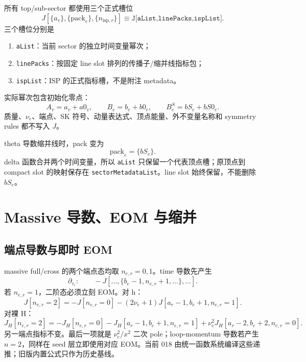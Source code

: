 ﻿\documentclass[a4paper,11pt]{article}
\begin{document}
所有 top/sub-sector 都使用三个正式槽位
\begin{equation}
 \boxed{
 J\!\left[
   \{a_v\},
   \{\mathrm{pack}_e\},
   \{n_{\mathrm{isp},r}\}
 \right]}
 \equiv
 \texttt{J[aList,linePacks,ispList]}.
 \label{threeSlotJ}
\end{equation}
三个槽位分别是
\begin{enumerate}
  \item \texttt{aList}：当前 sector 的独立时间变量幂次；
  \item \texttt{linePacks}：按固定 line slot 排列的传播子/缩并线指标包；
  \item \texttt{ispList}：ISP 的正式指标槽，不是附注 metadata。
\end{enumerate}

实际幂次包含初始化零点：
\begin{equation}
 A_v=a_v+a0_v,\qquad
 B_e=b_e+b0_e,\qquad
 B^S_e=bS_e+bS0_e.
\end{equation}
质量、$\nu_e$、端点、SK 符号、动量表达式、顶点能量、外不变量名称和 symmetry rules 都不写入 $J$。

theta 导数缩并线时，pack 变为
\begin{equation}
  \mathrm{pack}_e=\{bS_e\}.
\end{equation}
delta 函数合并两个时间变量，所以 \texttt{aList} 只保留一个代表顶点槽；原顶点到 compact slot 的映射保存在 \texttt{sectorMetadataList}。line slot 始终保留，不能删除 $bS_e$。

\section{Massive 导数、EOM 与缩并}

\subsection{端点导数与即时 EOM}

massive full/cross 的两个端点态均取 $n_{e,r}=0,1$。time 导数先产生
\begin{equation}
 \partial_{\tau_r}:\qquad
 -J[\ldots,\{b_e-1,n_{e,r}+1,\ldots\},\ldots].
\end{equation}
若 $n_{e,r}=1$，二阶态必须立刻 EOM。对 h：
\begin{equation}
 J[n_{e,r}=2]
 =-J[n_{e,r}=0]
  -(2\nu_e+1)J[a_r-1,b_e+1,n_{e,r}=1].
 \label{massiveEOM}
\end{equation}
对裸 H：
\begin{equation}
 J_H[n_{e,r}=2]
 =-J_H[n_{e,r}=0]
  -J_H[a_r-1,b_e+1,n_{e,r}=1]
  +\nu_e^2J_H[a_r-2,b_e+2,n_{e,r}=0].
 \label{bareHEOM}
\end{equation}
另一端点指标不变。最后一项就是 $\nu_e^2/x^2$ 二次 pole；loop-momentum 导数若产生 $n=2$，同样在 seed 层立即使用对应 EOM。当前 018 由统一函数系统编译这些递推；旧版内置公式只作为历史基线。
\end{document}
